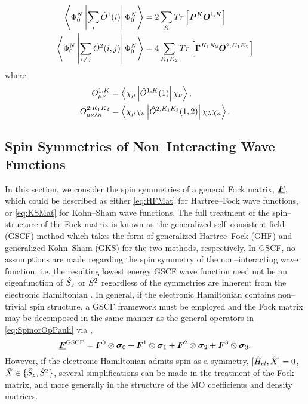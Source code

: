 \begin{align}
  \label{eq:BasisDenMatInner}
  \left\langle \Phi^N_0 \left\vert \sum_i \hat{O}^1(i) \right\vert \Phi^N_0 \right\rangle &= 2\sum_K Tr \left[ \boldsymbol{P}^K \boldsymbol{O}^{1,K} \right] \\
  \left\langle \Phi^N_0 \left\vert \sum_{i\neq j} \hat{O}^2(i,j) \right\vert \Phi^N_0 \right\rangle &= 4\sum_{K_1K_2} Tr \left[ \boldsymbol{\Gamma}^{K_1K_2} \boldsymbol{O}^{2,K_1K_2} \right]
\end{align}
where
\begin{align}
  O_{\mu\nu}^{1,K} &= \left\langle \chi_\mu \left\vert \hat{O}^{1,K}(1) \right\vert \chi_\nu \right\rangle,\\
  O_{\mu\nu\lambda\kappa}^{2,K_1K_2} &= \left\langle \chi_\mu\chi_\nu \left\vert \hat{O}^{2,K_1K_2}(1,2) \right\vert \chi_\lambda\chi_\kappa \right\rangle.
\end{align}




\subsection{Spin Symmetries of Non--Interacting Wave Functions} 

In this section, we consider the spin symmetries of a general Fock matrix, $\boldsymbol{\underline{F}}$, which could be described as either
\cref{eq:HFMat} for Hartree--Fock wave functions, or \cref{eq:KSMat} for Kohn--Sham wave functions.
The full treatment of the spin--structure of the Fock matrix is known as the generalized self--consistent field (GSCF) method
which takes the form of generalized Hartree--Fock (GHF) and generalized Kohn--Sham (GKS) for the two methods, respectively.
In GSCF, no assumptions are made regarding the spin symmetry of the non--interacting wave function, i.e. the resulting lowest 
energy
GSCF wave function need not be an eigenfunction of $\hat{S}_z$ or $\hat{S}^2$ regardless of the symmetries are inherent
from the electronic Hamiltonian . In general, if the electronic Hamiltonian contains non--trivial 
spin structure,
a GSCF framework must be employed and the Fock matrix may be decomposed in the same manner as the general operators
in \cref{eq:SpinorOpPauli} via ,
\begin{equation}
  \label{eq:GSCFFock}
  \boldsymbol{\underline{F}}^\mathrm{GSCF} = \boldsymbol{F}^0 \otimes \boldsymbol{\sigma}_{0} + \boldsymbol{F}^1 \otimes \boldsymbol{\sigma}_{1} + \boldsymbol{F}^2 \otimes \boldsymbol{\sigma}_{2} + \boldsymbol{F}^3 \otimes \boldsymbol{\sigma}_{3}.
\end{equation}
However, if the electronic Hamiltonian admits spin as a symmetry, 
$[\hat{H}_{el},\hat{X}] = 0$, $\hat{X} \in \{\hat{S}_z,\hat{S}^2\}$, several simplifications can be made in the treatment of the
Fock matrix, and more generally in the structure of the MO coefficients and density matrices.

